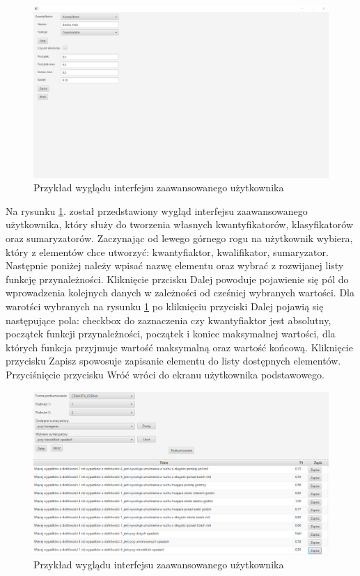 \documentclass{classrep}
\begin{document}
\begin{figure}[h!]
 \centering
 \includegraphics[width=15cm]{gui_2.png}
 \vspace{-0.3cm}
 \caption{Przykład wyglądu interfejsu zaawansowanego użytkownika}
 \label{gui2}
\end{figure}

Na rysunku \ref{gui2}. został przedstawiony wygląd interfejsu zaawansowanego użytkownika, który służy do tworzenia własnych kwantyfikatorów, klasyfikatorów oraz sumaryzatorów. Zaczynając od lewego górnego rogu na użytkownik wybiera, który z elementów chce utworzyć: kwantyfiaktor, kwalifikator, sumaryzator. Następnie poniżej należy wpisać nazwę elementu oraz wybrać z rozwijanej listy funkcję przynależności. Kliknięcie przcisku Dalej powoduje pojawienie się pól do wprowadzenia kolejnych danych w zależności od cześniej wybranych wartości. Dla warotści wybranych na rysunku \ref{gui2} po kliknięciu przyciski Dalej pojawią się następujące pola: checkbox do zaznaczenia czy kwantyfiaktor jest absolutny, początek funkcji przynależności, początek i koniec maksymalnej wartości, dla których funkcja przyjmuje wartość maksymalną oraz wartość końcową. Kliknięcie przycisku Zapisz spowosuje zapisanie elementu do listy dostępnych elementów. Przyciśnięcie przycisku Wróć wróci do ekranu użytkownika podstawowego. \\

\begin{figure}[h!]
 \centering
 \includegraphics[width=15cm]{gui_3.png}
 \vspace{-0.3cm}
 \caption{Przykład wyglądu interfejsu zaawansowanego użytkownika}
 \label{gui3}
\end{figure}
\end{document}
